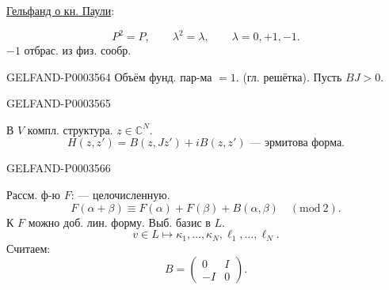 \uline{Гельфанд о кн. Паули}:
\begin{center}\begin{minipage}{\linewidth}
\begin{equation*}P^2=P,\qquad\lambda^2=\lambda,\qquad\lambda=0,+1,-1.\end{equation*}
\hfill\uline{$-1$} отбрас. из физ. сообр.
\end{minipage}\end{center}



\begin{GelfandAdjacentEvidence}{GELFAND-P000356}{4}
Объём фунд. пар-ма $=1$. (гл. решётка).
Пусть $BJ>0$.
\end{GelfandAdjacentEvidence}
\begin{GelfandAdjacentEvidence}{GELFAND-P000356}{5}

В $V$ компл. структура. $z\in\mathbb C^N$.
\begin{equation*}H(z,z')=B(z,Jz')+iB(z,z')\text{ --- эрмитова форма.}\end{equation*}
\end{GelfandAdjacentEvidence}
\begin{GelfandAdjacentEvidence}{GELFAND-P000356}{6}

Рассм. ф-ю $F$: --- целочисленную.
\begin{equation*}F(\alpha+\beta)\equiv F(\alpha)+F(\beta)+B(\alpha,\beta)\quad(\mathrm{mod}\ 2).\end{equation*}
К $F$ можно доб. лин. форму.
Выб. базис в $L$.
\begin{equation*}v\in L\mapsto\kappa_1,\ldots,\kappa_N,\ell_1,\ldots,\ell_N.\end{equation*}
Считаем:
\begin{equation*}B=\begin{pmatrix}0&I\\-I&0\end{pmatrix}.\end{equation*}
\end{GelfandAdjacentEvidence}
